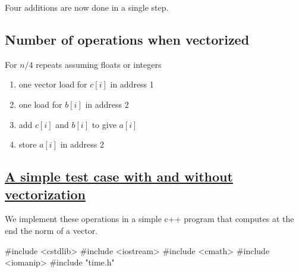 \documentclass[%
oneside,                 %
final,                   %
10pt]{article}
\begin{document}
\ecppcod


Four additions are now done in a single step.

\subsection{Number of operations when vectorized}
For $n/4$ repeats assuming floats or integers
\begin{enumerate}
\item one vector load for $c[i]$ in address 1

\item one load for $b[i]$ in address 2

\item add $c[i]$ and $b[i]$ to give $a[i]$

\item store $a[i]$ in address 2
\end{enumerate}

\noindent
\subsection{\href{{https://github.com/CompPhysics/ComputationalPhysicsMSU/blob/master/doc/Programs/LecturePrograms/programs/Classes/cpp/program7.cpp}}{A simple test case with and without vectorization}}
We implement these operations in a simple c++ program that computes at the end the norm of a vector.




















































\bcppcode
#include <cstdlib>
#include <iostream>
#include <cmath>
#include <iomanip>
#include "time.h"
\end{document}
